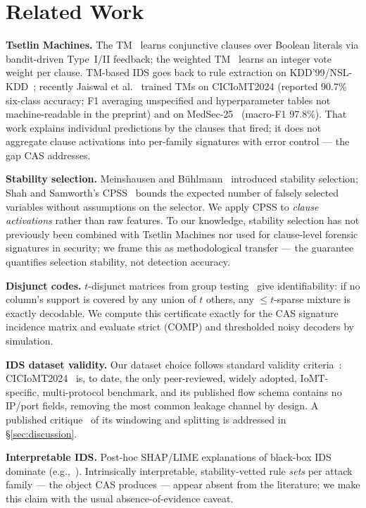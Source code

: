 \documentclass[conference]{IEEEtran}
\begin{document}
\section{Related Work}
\textbf{Tsetlin Machines.} The TM~\cite{granmo2018} learns conjunctive
clauses over Boolean literals via bandit-driven Type~I/II feedback; the
weighted TM~\cite{phoulady2020} learns an integer vote weight per clause.
TM-based IDS goes back to rule extraction on KDD'99/NSL-KDD~\cite{abeyrathna2020};
recently Jaiswal et al.~\cite{jaiswal2026iomt} trained TMs on CICIoMT2024
(reported 90.7\% six-class accuracy; F1 averaging unspecified and
hyperparameter tables not machine-readable in the preprint) and on
MedSec-25~\cite{jaiswal2026medsec} (macro-F1 97.8\%). That work explains
individual predictions by the clauses that fired; it does not aggregate
clause activations into per-family signatures with error control --- the gap
CAS addresses.

\textbf{Stability selection.} Meinshausen and B\"uhlmann~\cite{meinshausen2010}
introduced stability selection; Shah and Samworth's CPSS~\cite{shah2013}
bounds the expected number of falsely selected variables without assumptions
on the selector. We apply CPSS to \emph{clause activations} rather than raw
features. To our knowledge, stability selection has not previously been
combined with Tsetlin Machines nor used for clause-level forensic signatures
in security; we frame this as methodological transfer --- the guarantee
quantifies selection stability, not detection accuracy.

\textbf{Disjunct codes.} $t$-disjunct matrices from group
testing~\cite{du1993} give identifiability: if no column's support is
covered by any union of $t$ others, any $\le t$-sparse mixture is exactly
decodable. We compute this certificate exactly for the CAS signature
incidence matrix and evaluate strict (COMP) and thresholded noisy decoders
by simulation.

\textbf{IDS dataset validity.} Our dataset choice follows standard validity
criteria~\cite{sommer2010,engelen2021,arp2022}: CICIoMT2024~\cite{dadkhah2024}
is, to date, the only peer-reviewed, widely adopted, IoMT-specific,
multi-protocol benchmark, and its published flow schema contains no IP/port
fields, removing the most common leakage channel by design. A published
critique~\cite{domenech2025} of its windowing and splitting is addressed in
\S\ref{sec:discussion}.

\textbf{Interpretable IDS.} Post-hoc SHAP/LIME explanations of black-box IDS
dominate (e.g.,~\cite{xaiids2025}). Intrinsically interpretable,
stability-vetted rule \emph{sets} per attack family --- the object CAS
produces --- appear absent from the literature; we make this claim with the
usual absence-of-evidence caveat.
\end{document}
